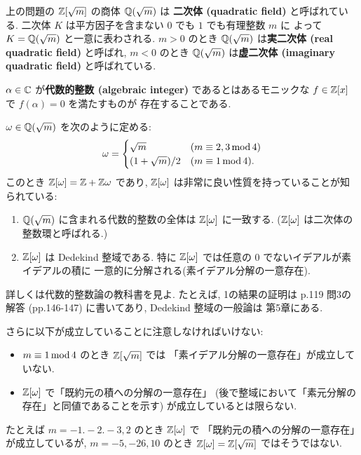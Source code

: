 \documentclass[12pt,twoside]{jarticle}
\begin{document}
\begin{guide}[二次体の整数環]
 上の問題の ${\mathbb Z}[\sqrt{m}]$ の商体 ${\mathbb Q}(\sqrt{m})$ は
 {\bf 二次体 (quadratic field)} と呼ばれている.
 二次体 $K$ は平方因子を含まない $0$ でも $1$ でも有理整数 $m$ に
 よって $K={\mathbb Q}(\sqrt{m})$ と一意に表わされる.
 $m>0$ のとき ${\mathbb Q}(\sqrt{m})$ は{\bf 実二次体 (real quadratic field)} 
 と呼ばれ, %
 $m<0$ のとき ${\mathbb Q}(\sqrt{m})$ は{\bf 虚二次体 (imaginary quadratic field)}
 と呼ばれている.

 $\alpha\in{\mathbb C}$ が{\bf 代数的整数 (algebraic integer)} 
 であるとはあるモニックな $f\in{\mathbb Z}[x]$ で $f(\alpha)=0$ を満たすものが
 存在することである.  

 $\omega\in{\mathbb Q}(\sqrt{m})$ を次のように定める:
 \begin{equation*}
  \omega = 
  \begin{cases}
   \sqrt{m}       & (m\equiv 2,3 \mathop{\mathrm{mod}}\nolimits 4) \\
   (1+\sqrt{m})/2 & (m\equiv 1 \mathop{\mathrm{mod}}\nolimits 4).  \\
  \end{cases}
 \end{equation*}
 このとき ${\mathbb Z}[\omega]={\mathbb Z}+{\mathbb Z}\omega$ であり, 
 ${\mathbb Z}[\omega]$ は非常に良い性質を持っていることが知られている:
 \begin{enumerate}
  \item ${\mathbb Q}(\sqrt{m})$ に含まれる代数的整数の全体は
   ${\mathbb Z}[\omega]$ に一致する.
   (${\mathbb Z}[\omega]$ は二次体の整数環と呼ばれる.)
  \item ${\mathbb Z}[\omega]$ は Dedekind 整域である.
   特に ${\mathbb Z}[\omega]$ では任意の $0$ でないイデアルが素イデアルの積に
   一意的に分解される(素イデアル分解の一意存在).
 \end{enumerate}
 詳しくは代数的整数論の教科書を見よ. 
 たとえば, 1の結果の証明は\cite{suron-1} p.119 問3の解答 (pp.146-147) 
 に書いてあり, 
 Dedekind 整域の一般論は \cite{kan-to-tai-1} 第5章にある.

 さらに以下が成立していることに注意しなければいけない:
 \begin{itemize}
  \item  $m\equiv 1\mathop{\mathrm{mod}}\nolimits 4$ のとき ${\mathbb Z}[\sqrt{m}]$ では
  「素イデアル分解の一意存在」が成立していない.
  \item ${\mathbb Z}[\omega]$ で「既約元の積への分解の一意存在」
   (後で整域において「素元分解の存在」と同値であることを示す) 
   が成立しているとは限らない. 
 \end{itemize}
 たとえば $m=-1.-2.-3, 2$ のとき ${\mathbb Z}[\omega]$ で
 「既約元の積への分解の一意存在」が成立しているが, %
 $m=-5,-26,10$ のとき ${\mathbb Z}[\omega]={\mathbb Z}[\sqrt{m}]$ ではそうではない.


\end{guide}
\end{document}
